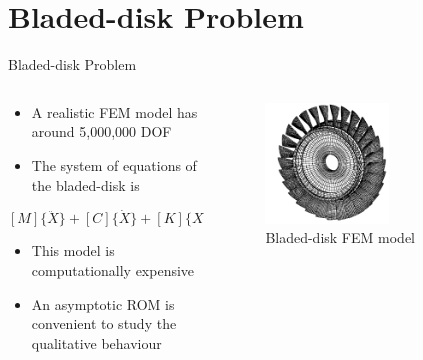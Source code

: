 \documentclass[dvipsnames, aspectratio = 169]{beamer}
\begin{document}
\section{Bladed-disk Problem}
\begin{frame}{Bladed-disk Problem}
	\begin{columns}
		\begin{column}{0.5\textwidth}
			\begin{itemize}
				\item A realistic FEM model has around 5,000,000 DOF
				\item The system of equations of the bladed-disk is
			\end{itemize}

			\begin{equation}\label{eq:general_bladed-disk}
				[M]\{\ddot{X}\} + [C]\{\dot{X}\} + [K]\{X\} + \{F_{nl}\} + \{F_a\} = 0,
			\end{equation}
			\begin{itemize}
				\item This model is computationally expensive
				\item An asymptotic ROM is convenient to study the qualitative behaviour
			\end{itemize}
		\end{column}
		\begin{column}{0.5\textwidth}
			\begin{figure}[h!]
				\centering
				\includegraphics[width = 0.6\textwidth]{Bladed_disk.png}
				\caption{Bladed-disk FEM model}
				\label{fig:rotationsymmetry}
			\end{figure}
		\end{column}
	\end{columns}
\end{frame}
\end{document}

